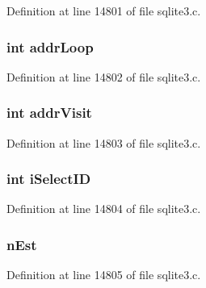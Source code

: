Definition at line 14801 of file sqlite3.\+c.

\hypertarget{struct_scan_status_a35cf2c02fad062814517e8da53b6d0d0}{}
\subsubsection[{addr\+Loop}]{\setlength{\rightskip}{0pt plus 5cm}int addr\+Loop}\label{struct_scan_status_a35cf2c02fad062814517e8da53b6d0d0}


Definition at line 14802 of file sqlite3.\+c.

\hypertarget{struct_scan_status_a4f13258e01377a59c73aa9eff8e1d97b}{}
\subsubsection[{addr\+Visit}]{\setlength{\rightskip}{0pt plus 5cm}int addr\+Visit}\label{struct_scan_status_a4f13258e01377a59c73aa9eff8e1d97b}


Definition at line 14803 of file sqlite3.\+c.

\hypertarget{struct_scan_status_acd2e4b38d901333ed46814f4d8f35e9b}{}
\subsubsection[{i\+Select\+I\+D}]{\setlength{\rightskip}{0pt plus 5cm}int i\+Select\+I\+D}\label{struct_scan_status_acd2e4b38d901333ed46814f4d8f35e9b}


Definition at line 14804 of file sqlite3.\+c.

\hypertarget{struct_scan_status_a998cf59448d270dc50b324b4fe1215ff}{}
\subsubsection[{n\+Est}]{ n\+Est}\label{struct_scan_status_a998cf59448d270dc50b324b4fe1215ff}


Definition at line 14805 of file sqlite3.\+c.

\hypertarget{struct_scan_status_a661118d86ac4127d40bf3be78d92117d}{}
